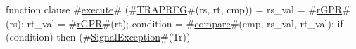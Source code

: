 function clause #\hyperref[zexecute]{execute}# (#\hyperref[zTRAPREG]{TRAPREG}#(rs, rt, cmp)) =
  {
    rs_val = #\hyperref[zrGPR]{rGPR}#(rs);
    rt_val = #\hyperref[zrGPR]{rGPR}#(rt);
    condition = #\hyperref[zcompare]{compare}#(cmp, rs_val, rt_val);
    if (condition) then
      (#\hyperref[zSignalException]{SignalException}#(Tr))
  }
